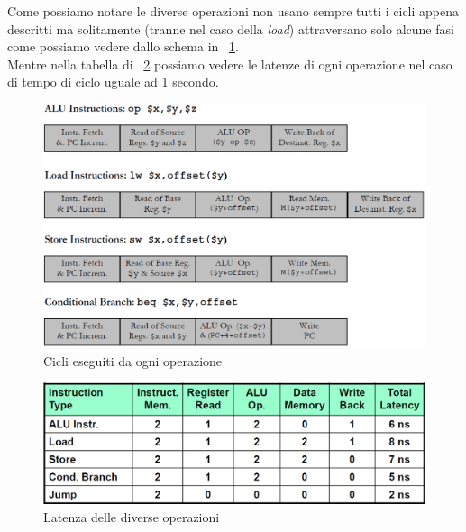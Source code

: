 Come possiamo notare le diverse operazioni non usano sempre tutti i cicli appena descritti ma solitamente (tranne nel caso della \emph{load}) attraversano solo alcune fasi come possiamo vedere dallo schema in \figurename~\ref{fig:cicli}.\\
Mentre nella tabella di \figurename~\ref{fig:latency} possiamo vedere le latenze di ogni operazione nel caso di tempo di ciclo uguale ad 1 secondo.
\begin{figure}[htb]
\centering
\includegraphics[scale=0.5]{img/cicli.png}
\caption{Cicli eseguiti da ogni operazione}\label{fig:cicli}
\end{figure}
\begin{figure}[htb]
\centering
\includegraphics[scale=0.4]{img/latency.png}
\caption{Latenza delle diverse operazioni}\label{fig:latency}
\end{figure}
